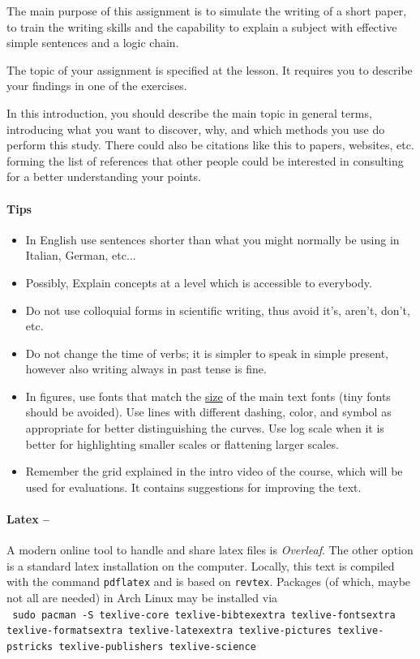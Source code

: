 \documentclass[prl,twocolumn]{revtex4-1}
\begin{document}
The main purpose of this assignment is to simulate the writing of a short paper, to train the writing skills and the capability to explain a subject with effective simple sentences and a logic chain.

The topic of your assignment is specified at the lesson.
It requires you to describe your findings in one of the exercises.

In this introduction,
you should describe the main topic in general terms, introducing what you want to discover, why, and which
methods you use do perform this study.
There could also be citations like this \cite{pap1} to papers, websites, etc. forming the list of references that other people could be interested in consulting for a better understanding your points.

\paragraph{\bf Tips}
\begin{itemize}
\item In English use sentences shorter than what you might normally be using in Italian, German, etc...
\item Possibly, Explain concepts at a level which is accessible to everybody.
\item Do not use colloquial forms in scientific writing, thus avoid it's, aren't, don't, etc.
\item Do not change the time of verbs; it is simpler to speak in simple present, however also writing always in past tense is fine.
\item In figures, use fonts that match the \underline{size} of the main text fonts (tiny fonts should be avoided). Use lines with different dashing, color, and symbol as appropriate for better distinguishing the curves. Use log scale when it is better for highlighting smaller scales or flattening larger scales. 
\item Remember the grid explained in the intro video of the course, which will be used for evaluations. It contains suggestions for improving the text.
\end{itemize}




\paragraph{\bf Latex --}

A modern online tool to handle and share latex files is {\em Overleaf}. The other option is a standard latex installation on the computer.
Locally, this text is compiled with the command \texttt{pdflatex} and is based on \texttt{revtex}.
Packages (of which, maybe not all are needed) in Arch Linux may be installed via\\
\texttt{
  sudo pacman -S texlive-core texlive-bibtexextra texlive-fontsextra  texlive-formatsextra texlive-latexextra texlive-pictures texlive-pstricks texlive-publishers  texlive-science}
\end{document}
